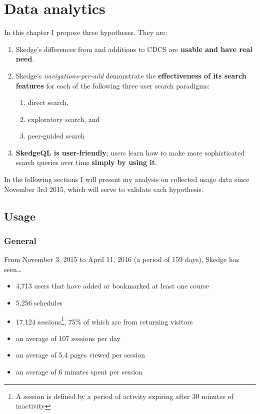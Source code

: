 
\chapter{Data analytics}

In this chapter I propose three hypotheses. They are:

\begin{enumerate}
  \item Skedge's differences from and additions to CDCS are \textbf{usable and have real need}.

  \item Skedge’s \emph{navigations-per-add} demonstrate the \textbf{effectiveness of its search features} for each of the following three user search paradigms:

  \begin{enumerate}
    \item direct search,
    \item exploratory search, and
    \item peer-guided search
  \end{enumerate}

  \item \textbf{SkedgeQL is user-friendly}; users learn how to make more sophisticated search queries over time \textbf{simply by using it}.
\end{enumerate}

\noindent In the following sections I will present my analysis on collected usage data since November 3rd 2015, which will serve to validate each hypothesis.

\section{Usage}

\subsection{General}

From November 3, 2015 to April 11, 2016 (a period of 159 days), Skedge has seen\ldots

\begin{itemize}
  \item 4,713 users that have added or bookmarked at least one course
  \item 5,256 schedules
  \item 17,124 sessions\footnote{A session is defined by a period of activity expiring after 30 minutes of inactivity}, 75\% of which are from returning visitors
  \item an average of 107 sessions per day
  \item an average of 5.4 pages viewed per session 
  \item an average of 6 minutes spent per session
\end{itemize}

